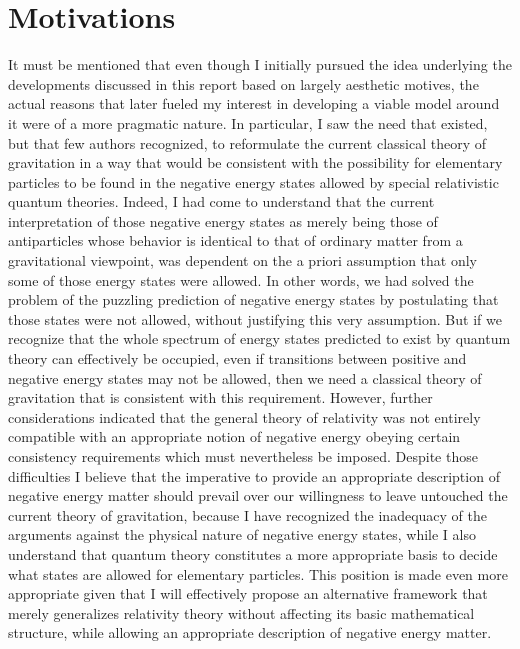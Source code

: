 \documentclass[notitlepage,12pt]{report}
\begin{document}
\section{Motivations}

It must be mentioned that even though I initially pursued the idea underlying the developments discussed in this report based on largely aesthetic motives, the actual reasons that later fueled my interest in developing a viable model around it were of a more pragmatic nature. In particular, I saw the need that existed, but that few authors recognized, to reformulate the current classical theory of gravitation in a way that would be consistent with the possibility for elementary particles to be found in the negative energy states allowed by special relativistic quantum theories. Indeed, I had come to understand that the current interpretation of those negative energy states as merely being those of antiparticles whose behavior is identical to that of ordinary matter from a gravitational viewpoint, was dependent on the a priori assumption that only some of those energy states were allowed. In other words, we had solved the problem of the puzzling prediction of negative energy states by postulating that those states were not allowed, without justifying this very assumption. But if we recognize that the whole spectrum of energy states predicted to exist by quantum theory can effectively be occupied, even if transitions between positive and negative energy states may not be allowed, then we need a classical theory of gravitation that is consistent with this requirement. However, further considerations indicated that the general theory of relativity was not entirely compatible with an appropriate notion of negative energy obeying certain consistency requirements which must nevertheless be imposed. Despite those difficulties I believe that the imperative to provide an appropriate description of negative energy matter should prevail over our willingness to leave untouched the current theory of gravitation, because I have recognized the inadequacy of the arguments against the physical nature of negative energy states, while I also understand that quantum theory constitutes a more appropriate basis to decide what states are allowed for elementary particles. This position is made even more appropriate given that I will effectively propose an alternative framework that merely generalizes relativity theory without affecting its basic mathematical structure, while allowing an appropriate description of negative energy matter.
\end{document}
